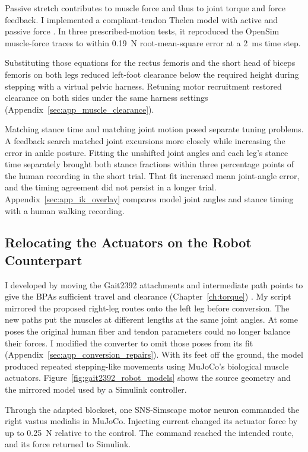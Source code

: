 Passive stretch contributes to muscle force and thus to joint torque and force feedback. I implemented a compliant-tendon Thelen model with active and passive force \citep{thelen_adjustment_2003,opensim_muscle_curves_44}. In three prescribed-motion tests, it reproduced the OpenSim muscle-force traces to within \qty{0.19}{\newton} root-mean-square error at a \qty{2}{\milli\second} time step.

Substituting those equations for the rectus femoris and the short head of biceps femoris on both legs reduced left-foot clearance below the required height during stepping with a virtual pelvic harness. Retuning motor recruitment restored clearance on both sides under the same harness settings (Appendix~\ref{sec:app_muscle_clearance}).

Matching stance time and matching joint motion posed separate tuning problems. A feedback search matched joint excursions more closely while increasing the error in ankle posture. Fitting the unshifted joint angles and each leg's stance time separately brought both stance fractions within three percentage points of the human recording in the short trial. That fit increased mean joint-angle error, and the timing agreement did not persist in a longer trial. Appendix~\ref{sec:app_ik_overlay} compares model joint angles and stance timing with a human walking recording.

\subsection{Relocating the Actuators on the Robot Counterpart}

I developed  by moving the Gait2392 attachments and intermediate path points to give the BPAs sufficient travel and clearance (Chapter~\ref{ch:torque}) \citep{bolen_bipedal_2019,morrow_optimization_2020}. My script mirrored the proposed right-leg routes onto the left leg before conversion. The new paths put the muscles at different lengths at the same joint angles. At some poses the original human fiber and tendon parameters could no longer balance their forces. I modified the converter to omit those poses from its fit (Appendix~\ref{sec:app_conversion_repairs}). With its feet off the ground, the model produced repeated stepping-like movements using MuJoCo's biological muscle actuators. Figure~\ref{fig:gait2392_robot_models} shows the source geometry and the mirrored model used by a Simulink controller.

Through the adapted blockset, one SNS-Simscape motor neuron commanded the right vastus medialis in MuJoCo. Injecting current changed its actuator force by up to \qty{0.25}{\newton} relative to the control. The command reached the intended route, and its force returned to Simulink.

